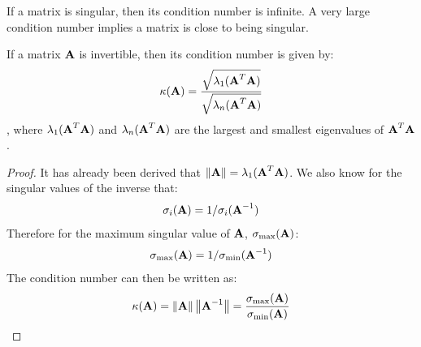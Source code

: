 \documentclass[a4paper]{article}
\begin{document}
If a matrix is singular, then its condition number is infinite. A very large condition number implies a matrix is close to being singular.

\begin{corollary}
	If a matrix $\textbf{A}$ is invertible, then its condition number is given by:
	\begin{equation}
		\kappa(\textbf{A}) = \frac{\sqrt{\lambda_1(\textbf{A}^T\textbf{A})}}{\sqrt{\lambda_n(\textbf{A}^T\textbf{A})}}
	\end{equation}
, where $\lambda_1(\textbf{A}^T\textbf{A})$ and $\lambda_n(\textbf{A}^T\textbf{A})$ are the largest and smallest eigenvalues of $\textbf{A}^T\textbf{A}$.
\end{corollary}
\begin{proof}
	It has already been derived that $\left\lVert\textbf{A}\right\rVert = \lambda_1(\textbf{A}^T\textbf{A})$. We also know for the singular values of the inverse that:
	\begin{equation*}
		\sigma_i(\textbf{A}) = 1 / \sigma_i(\textbf{A}^{-1})
	\end{equation*}
	Therefore for the maximum singular value of $\textbf{A}$, $\sigma_{\max}(\textbf{A})$:
	\begin{equation*}
		\sigma_{\max}(\textbf{A}) = 1 / \sigma_{\min}(\textbf{A}^{-1})	
	\end{equation*}
	The condition number can then be written as:
	\begin{equation*}
		\kappa(\textbf{A}) = \left\lVert\textbf{A}\right\rVert \left\lVert\textbf{A}^{-1}\right\rVert = \frac{\sigma_{\max}(\textbf{A})}{\sigma_{\min}(\textbf{A})}	
	\end{equation*}
\end{proof}
\end{document}
